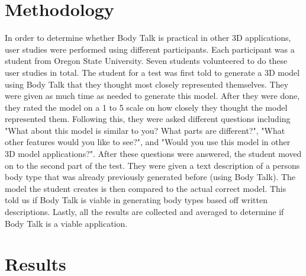 \documentclass[journal]{vgtc}                %
\begin{document}
\section{Methodology}
\noindent In order to determine whether Body Talk is practical in other 3D applications, user studies were performed using different participants. Each participant was a student from Oregon State University. Seven students volunteered to do these user studies in total. \newline \newline
\noindent The student for a test was first told to generate a 3D model using Body Talk that they thought most closely represented themselves. They were given as much time as needed to generate this model. After they were done, they rated the model on a 1 to 5 scale on how closely they thought the model represented them. Following this, they were asked different questions including "What about this model is similar to you? What parts are different?", "What other features would you like to see?", and "Would you use this model in other 3D model applications?".\newline \newline
\noindent After these questions were answered, the student moved on to the second part of the test. They were given a text description of a persons body type that was already previously generated before (using Body Talk). The model the student creates is then compared to the actual correct model. This told us if Body Talk is viable in generating body types based off written descriptions. \newline\newline
\noindent Lastly, all the results are collected and averaged to determine if Body Talk is a viable application.


\section{Results}
\end{document}
